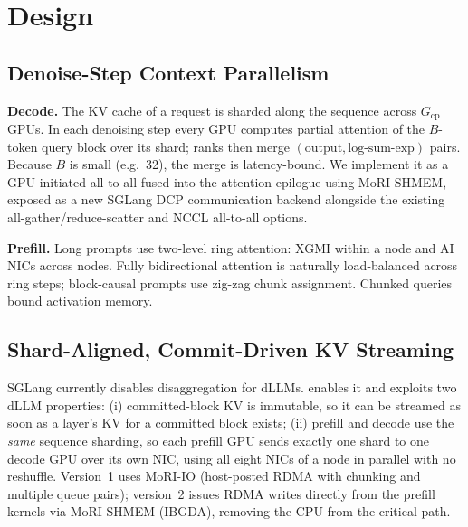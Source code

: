 \section{\sys Design}
\label{sec:design}


\subsection{Denoise-Step Context Parallelism}
\label{sec:design-cp}
\textbf{Decode.} The KV cache of a request is sharded along the sequence across $G_{\text{cp}}$ GPUs.
In each denoising step every GPU computes partial attention of the $B$-token query block over its
shard; ranks then merge $(\text{output}, \text{log-sum-exp})$ pairs. Because $B$ is small
(e.g.\ 32), the merge is latency-bound. We implement it as a GPU-initiated all-to-all fused into the
attention epilogue using MoRI-SHMEM, exposed as a new SGLang DCP communication backend alongside the
existing all-gather/reduce-scatter and NCCL all-to-all options.

\textbf{Prefill.} Long prompts use two-level ring attention: XGMI within a node and AI NICs across
nodes. Fully bidirectional attention is naturally load-balanced across ring steps; block-causal
prompts use zig-zag chunk assignment. Chunked queries bound activation memory.


\subsection{Shard-Aligned, Commit-Driven KV Streaming}
\label{sec:design-pd}
SGLang currently disables disaggregation for dLLMs. \sys enables it and exploits two dLLM properties:
(i) committed-block KV is immutable, so it can be streamed as soon as a layer's KV for a committed
block exists; (ii) prefill and decode use the \emph{same} sequence sharding, so each prefill GPU sends
exactly one shard to one decode GPU over its own NIC, using all eight NICs of a node in parallel with
no reshuffle. Version~1 uses MoRI-IO (host-posted RDMA with chunking and multiple queue pairs);
version~2 issues RDMA writes directly from the prefill kernels via MoRI-SHMEM (IBGDA), removing the
CPU from the critical path.

